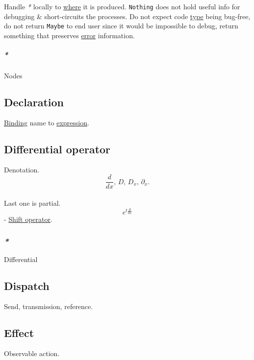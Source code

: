 \documentclass[11pt]{article}
\begin{document}
Handle \emph{*} locally to \hyperref[org3e5903d]{where} it is produced. \texttt{Nothing} does not hold useful info for debugging \& short-circuits the processes. Do not expect code \hyperref[orgc4aea2f]{type} being bug-free, do not return \texttt{Maybe} to end user since it would be impossible to debug, return something that preserves \hyperref[org2b27c5e]{error} information.\\

\subparagraph{\emph{*}}
\label{sec:orgb73e48a}

\label{orgc4f355a}Nodes\\

\subsection{\label{org8fbd848}Declaration}
\label{sec:orgc7afb27}
\hyperref[org6b75da3]{Binding} name to \hyperref[org9021dd7]{expression}.\\

\subsection{\label{orgaccc1c3}Differential operator}
\label{sec:org904047e}
Denotation.\\
$$ \frac{d}{dx}, \, D, \, D_{x}, \, \partial_{x}. $$\\
Last one is partial.\\

$$ e^{t{\frac{d}{dx}}} $$ - \hyperref[org4712978]{Shift operator}.\\

\subsubsection{\emph{*}}
\label{sec:orgd4610e6}

\label{org04feaf6}Differential\\

\subsection{\label{org4a11068}Dispatch}
\label{sec:orgcc127b2}
Send, transmission, reference.\\

\subsection{\label{orgc34399c}Effect}
\label{sec:org346020b}
Observable action.\\
\end{document}
